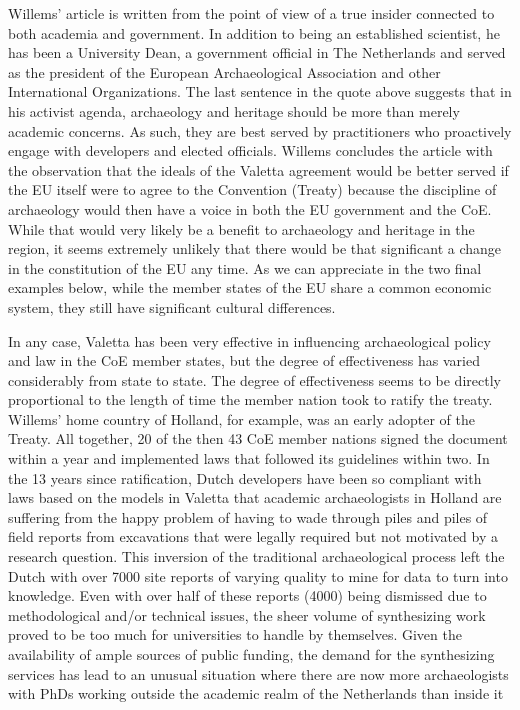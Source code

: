 \documentclass[spanish]{ijsra}
\begin{document}
Willems’ article is written from the point of view of a true insider connected to both academia and government. In addition to being an established scientist, he has been a University Dean, a government official in The Netherlands and served as the president of the European Archaeological Association and other International Organizations. The last sentence in the quote above suggests that in his activist agenda, archaeology and heritage should be more than merely academic concerns. As such, they are best served by practitioners who proactively engage with developers and elected officials. Willems concludes the article with the observation that the ideals of the Valetta agreement would be better served if the EU itself were to agree to the Convention (Treaty) because the discipline of archaeology would then have a voice in both the EU government and the CoE. While that would very likely be a benefit to archaeology and heritage in the region, it seems extremely unlikely that there would be that significant a change in the constitution of the EU any time. As we can appreciate in the two final examples below, while the member states of the EU share a common economic system, they still have significant cultural differences. 

In any case, Valetta has been very effective in influencing archaeological policy and law in the CoE member states, but the degree of effectiveness has varied considerably from state to state. The degree of effectiveness seems to be directly proportional to the length of time the member nation took to ratify the treaty. Willems’ home country of Holland, for example, was an early adopter of the Treaty. All together, \num{20} of the then \num{43} CoE member nations signed the document within a year and implemented laws that followed its guidelines within two. 
In the \num{13} years since ratification, Dutch developers have been so compliant with laws based on the models in Valetta that academic archaeologists in Holland are suffering from the happy problem of having to wade through piles and piles of field reports from excavations that were legally required but not motivated by a research question. This inversion of the traditional archaeological process left the Dutch with over \num{7000} site reports of varying quality to mine for data to turn into knowledge. 
Even with over half of these reports (\num{4000}) being dismissed due to methodological and/or technical issues, the sheer volume of synthesizing work proved to be too much for universities to handle by themselves. Given the availability of ample sources of public funding, the demand for the synthesizing services has lead to an unusual situation where there are now more archaeologists with PhDs working outside the academic realm of the Netherlands than inside it %
\end{document}
